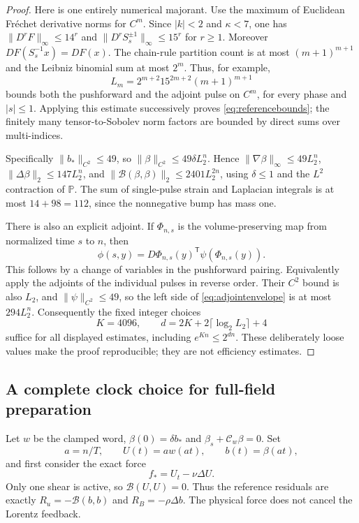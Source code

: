 \documentclass[11pt,a4paper]{amsart}
\theoremstyle{definition}
\theoremstyle{remark}
\numberwithin{equation}{section}
\newcommand{\PP}{\mathbb P}
\newcommand{\Bcal}{\mathcal B}
\newcommand{\Ccal}{\mathcal C}
\newcommand{\norm}[1]{\lVert #1\rVert}
\begin{document}
\begin{proof}
Here is one entirely numerical majorant. Use the maximum of Euclidean Fr\'echet derivative norms for $C^m$. Since $|k|<2$ and $\kappa<7$, one has $\norm{D^rF}_\infty\le14^r$ and $\norm{D^rS_s^{\pm1}}_\infty\le15^r$ for $r\ge1$. Moreover $DF(S_s^{-1}x)=DF(x)$. The chain-rule partition count is at most $(m+1)^{m+1}$ and the Leibniz binomial sum at most $2^m$. Thus, for example,
\begin{equation}\label{eq:explicitLm}
 L_m=2^{m+2}15^{2m+2}(m+1)^{m+1}
\end{equation}
bounds both the pushforward and the adjoint pulse on $C^m$, for every phase and $|s|\le1$. Applying this estimate successively proves \eqref{eq:referencebounds}; the finitely many tensor-to-Sobolev norm factors are bounded by direct sums over multi-indices.

Specifically $\norm{b_*}_{C^2}\le49$, so $\norm\beta_{C^2}\le49\delta L_2^n$. Hence $\norm{\nabla\beta}_\infty\le49L_2^n$, $\norm{\Delta\beta}_2\le147L_2^n$, and $\norm{\Bcal(\beta,\beta)}_2\le2401L_2^{2n}$, using $\delta\le1$ and the $L^2$ contraction of $\PP$. The sum of single-pulse strain and Laplacian integrals is at most $14+98=112$, since the nonnegative bump has mass one.

There is also an explicit adjoint. If $\Phi_{n,s}$ is the volume-preserving map from normalized time $s$ to $n$, then
\[
 \phi(s,y)=D\Phi_{n,s}(y)^{\mathsf T}
                    \psi(\Phi_{n,s}(y)).
\]
This follows by a change of variables in the pushforward pairing. Equivalently apply the adjoints of the individual pulses in reverse order. Their $C^2$ bound is also $L_2$, and $\norm\psi_{C^2}\le49$, so the left side of \eqref{eq:adjointenvelope} is at most $294L_2^n$. Consequently the fixed integer choices
\begin{equation}\label{eq:explicitKd}
 K=4096,\qquad d=2K+2\lceil\log_2L_2\rceil+4
\end{equation}
suffice for all displayed estimates, including $e^{Kn}\le2^{dn}$. These deliberately loose values make the proof reproducible; they are not efficiency estimates.
\end{proof}

\subsection{A complete clock choice for full-field preparation}
Let $w$ be the clamped word, $\beta(0)=\delta b_*$ and $\beta_s+\Ccal_w\beta=0$. Set
\begin{equation}\label{eq:maincarrier}
 a=n/T,\qquad U(t)=aw(at),\qquad b(t)=\beta(at),
\end{equation}
and first consider the exact force
\begin{equation}\label{eq:mainforce}
 f_*=U_t-\nu\Delta U.
\end{equation}
Only one shear is active, so $\Bcal(U,U)=0$. Thus the reference residuals are exactly
$R_u=-\Bcal(b,b)$ and $R_B=-\rho\Delta b$. The physical force does not cancel the Lorentz feedback.
\end{document}
